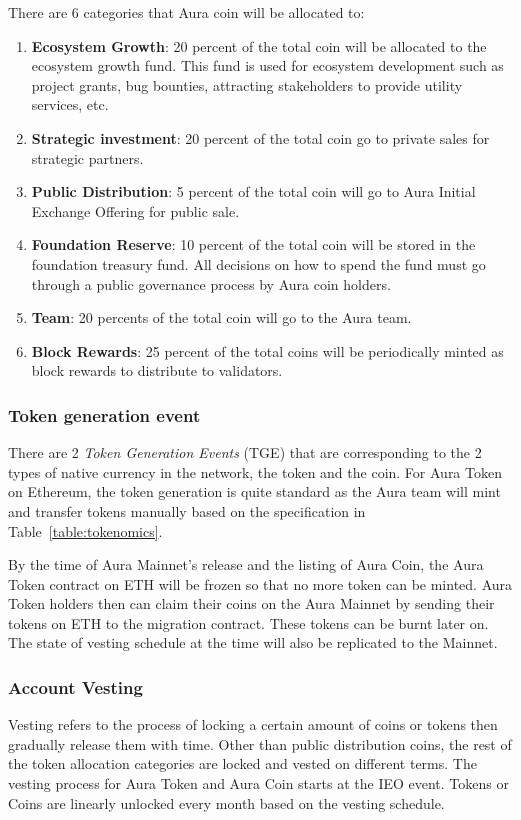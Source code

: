 \documentclass[12pt]{article}
\begin{document}
There are 6 categories that Aura coin will be allocated to:
\begin{enumerate}
    \item \textbf{Ecosystem Growth}: 20 percent of the total coin will be allocated to the ecosystem growth fund. This fund is used for ecosystem development such as project grants, bug bounties, attracting stakeholders to provide utility services, etc. 
    \item \textbf{Strategic investment}: 20 percent of the total coin go to private sales for strategic partners.
    \item \textbf{Public Distribution}: 5 percent of the total coin will go to Aura Initial Exchange Offering for public sale.
    \item \textbf{Foundation Reserve}: 10 percent of the total coin will be stored in the foundation treasury fund. All decisions on how to spend the fund must go through a public governance process by Aura coin holders. 
    \item \textbf{Team}: 20 percents of the total coin will go to the Aura team.
    \item \textbf{Block Rewards}: 25 percent of the total coins will be periodically minted as block rewards to distribute to validators.
\end{enumerate}

\subsubsection{Token generation event}
There are 2 \emph{Token Generation Events} (TGE) that are corresponding to the 2 types of native currency in the network, the token and the coin. For Aura Token on Ethereum, the token generation is quite standard as the Aura team will mint and transfer tokens manually based on the specification in Table~\ref{table:tokenomics}.

By the time of Aura Mainnet's release and the listing of Aura Coin, the Aura Token contract on ETH will be frozen so that no more token can be minted. Aura Token holders then can claim their coins on the Aura Mainnet by sending their tokens on ETH to the migration contract. These tokens can be burnt later on. The state of vesting schedule at the time will also be replicated to the Mainnet. 

\subsubsection{Account Vesting}
Vesting refers to the process of locking a certain amount of coins or tokens then gradually release them with time. Other than public distribution coins, the rest of the token allocation categories are locked and vested on different terms. The vesting process for Aura Token and Aura Coin starts at the IEO event. Tokens or Coins are linearly unlocked every month based on the vesting schedule.
\end{document}
